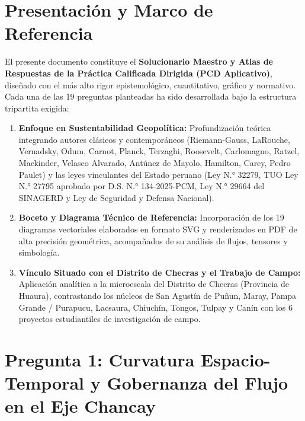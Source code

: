 \documentclass[11pt,a4paper]{article}
\begin{document}
\newpage
\tableofcontents
\newpage

\section*{Presentación y Marco de Referencia}

El presente documento constituye el \textbf{Solucionario Maestro y Atlas de Respuestas de la Práctica Calificada Dirigida (PCD Aplicativo)}, diseñado con el más alto rigor epistemológico, cuantitativo, gráfico y normativo. Cada una de las 19 preguntas planteadas ha sido desarrollada bajo la estructura tripartita exigida:

\begin{enumerate}
    \item \textbf{Enfoque en Sustentabilidad Geopolítica:} Profundización teórica integrando autores clásicos y contemporáneos (Riemann-Gauss, LaRouche, Vernadsky, Odum, Carnot, Planck, Terzaghi, Roosevelt, Carlomagno, Ratzel, Mackinder, Velasco Alvarado, Antúnez de Mayolo, Hamilton, Carey, Pedro Paulet) y las leyes vinculantes del Estado peruano (Ley N.° 32279, TUO Ley N.° 27795 aprobado por D.S. N.° 134-2025-PCM, Ley N.° 29664 del SINAGERD y Ley de Seguridad y Defensa Nacional).
    \item \textbf{Boceto y Diagrama Técnico de Referencia:} Incorporación de los 19 diagramas vectoriales elaborados en formato SVG y renderizados en PDF de alta precisión geométrica, acompañados de su análisis de flujos, tensores y simbología.
    \item \textbf{Vínculo Situado con el Distrito de Checras y el Trabajo de Campo:} Aplicación analítica a la microescala del Distrito de Checras (Provincia de Huaura), contrastando los núcleos de San Agustín de Puñun, Maray, Pampa Grande / Purapucu, Lacsaura, Chiuchín, Tongos, Tulpay y Canín con los 6 proyectos estudiantiles de investigación de campo.
\end{enumerate}

\newpage

\section{Pregunta 1: Curvatura Espacio-Temporal y Gobernanza del Flujo en el Eje Chancay}
\end{document}
